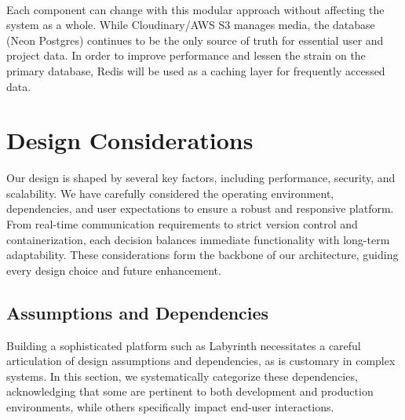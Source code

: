 \documentclass{FastFyp}
\begin{document}
\\
Each component can change with this modular approach without affecting the system as a whole.  While Cloudinary/AWS S3 manages media, the database (Neon Postgres) continues to be the only source of truth for essential user and project data.  In order to improve performance and lessen the strain on the primary database, Redis will be used as a caching layer for frequently accessed data.
\section{Design Considerations}
Our design is shaped by several key factors, including performance, security, and scalability. We have carefully considered the operating environment, dependencies, and user expectations to ensure a robust and responsive platform. From real-time communication requirements to strict version control and containerization, each decision balances immediate functionality with long-term adaptability. These considerations form the backbone of our architecture, guiding every design choice and future enhancement.
\subsection{Assumptions and Dependencies}
Building a sophisticated platform such as Labyrinth necessitates a careful articulation of design assumptions and dependencies, as is customary in complex systems. In this section, we systematically categorize these dependencies, acknowledging that some are pertinent to both development and production environments, while others specifically impact end-user interactions.
\end{document}
